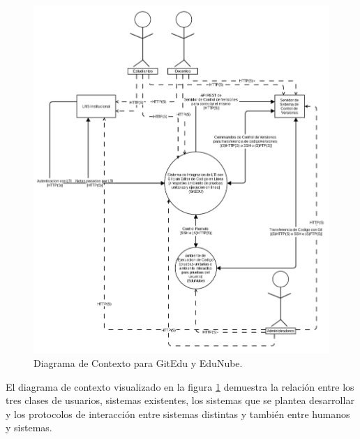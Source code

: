 \begin{figure}
  \begin{center}
    \includegraphics[width=1.0\textwidth]{Figures/contexto.png}
  \end{center}
  \caption{Diagrama de Contexto para GitEdu y EduNube.}
  \label{context}
\end{figure}

El diagrama de contexto visualizado en la figura \ref{context} demuestra la relación entre los tres clases de usuarios, sistemas existentes, los sistemas que se plantea desarrollar y los protocolos de interacción entre sistemas distintas y también entre humanos y sistemas.

